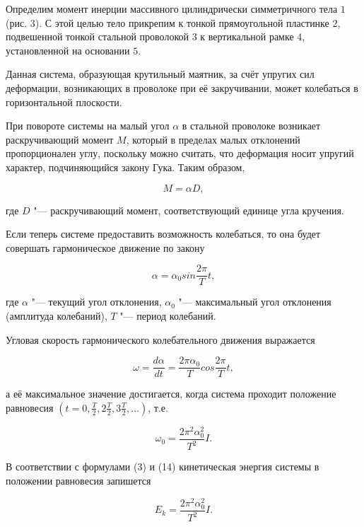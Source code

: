 Определим момент инерции массивного цилиндрически симметричного тела $1$ (рис. 3).
С этой целью тело прикрепим к тонкой прямоугольной пластинке $2$,
подвешенной тонкой стальной проволокой $3$ к вертикальной рамке $4$,
установленной на основании $5$.

Данная система, образующая крутильный маятник, за счёт упругих сил деформации,
возникающих в проволоке при её закручивании, может колебаться в горизонтальной плоскости.

При повороте системы на малый угол $\alpha$ в стальной проволоке возникает раскручивающий момент $M$,
который в пределах малых отклонений пропорционален углу, поскольку можно считать,
что деформация носит упругий характер, подчиняющийся закону Гука. Таким образом, 

\begin{equation}
    M = \alpha D,
\end{equation}

где $D$ "--- раскручивающий момент, соответствующий единице угла кручения.

Если теперь системе предоставить возможность колебаться,
то она будет совершать гармоническое движение по закону

\begin{equation}
    \alpha = \alpha_0 sin\frac{2\pi}{T}t,
\end{equation}

где $\alpha$ "--- текущий угол отклонения, $\alpha_0$ "--- максимальный угол отклонения (амплитуда колебаний),
$T$ "--- период колебаний.

Угловая скорость гармонического колебательного движения выражается

\begin{equation}
    \omega = \frac{d\alpha}{dt} = \frac{2\pi\alpha_0}{T}cos\frac{2\pi}{T}t,
\end{equation}

а её максимальное значение достигается, когда система проходит положение равновесия $(t = 0, \frac{T}{2}, 2\frac{T}{2}, 3\frac{T}{2}, \dots)$, т.е.

\begin{equation}
    \omega_0 = \frac{2\pi^2\alpha_0^2}{T^2}I.
\end{equation}

В соответствии с формулами (3) и (14) кинетическая энергия системы в положении равновесия запишется

\begin{equation}
    E_k = \frac{2\pi^2\alpha_0^2}{T^2}I.
\end{equation}

